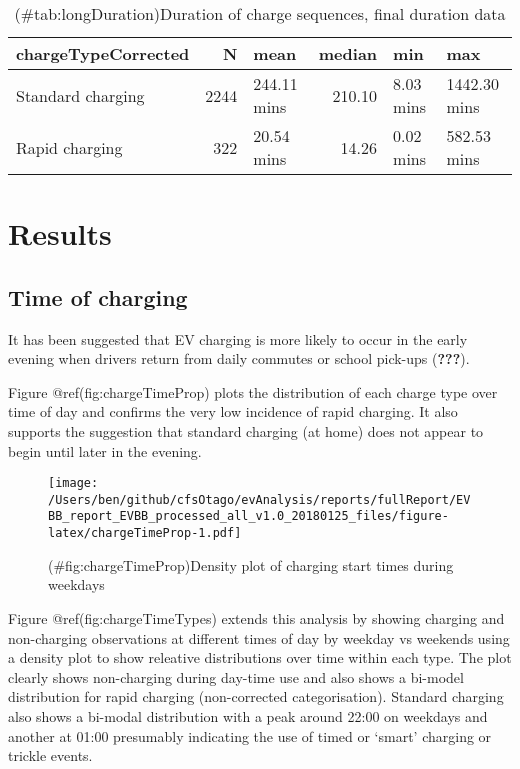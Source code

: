 \documentclass[]{article}
\begin{document}
\begin{table}[t]

\caption{(\#tab:longDuration)Duration of charge sequences, final duration data}
\centering
\begin{tabular}{l|r|l|r|l|l}
\hline
chargeTypeCorrected & N & mean & median & min & max\\
\hline
Standard charging & 2244 & 244.11 mins & 210.10 & 8.03 mins & 1442.30 mins\\
\hline
Rapid charging & 322 & 20.54 mins & 14.26 & 0.02 mins & 582.53 mins\\
\hline
\end{tabular}
\end{table}

\hypertarget{results}{%
\section{Results}\label{results}}

\hypertarget{time-of-charging}{%
\subsection{Time of charging}\label{time-of-charging}}

It has been suggested that EV charging is more likely to occur in the early evening when drivers return from daily commutes or school pick-ups ({\textbf{???}}).

Figure @ref(fig:chargeTimeProp) plots the distribution of each charge type over time of day and confirms the very low incidence of rapid charging. It also supports the suggestion that standard charging (at home) does not appear to begin until later in the evening.

\begin{figure}
\centering
\texttt{[image: /Users/ben/github/cfsOtago/evAnalysis/reports/fullReport/EVBB\_report\_EVBB\_processed\_all\_v1.0\_20180125\_files/figure-latex/chargeTimeProp-1.pdf]}
\caption{(\#fig:chargeTimeProp)Density plot of charging start times during weekdays}
\end{figure}

Figure @ref(fig:chargeTimeTypes) extends this analysis by showing charging and non-charging observations at different times of day by weekday vs weekends using a density plot to show releative distributions over time within each type. The plot clearly shows non-charging during day-time use and also shows a bi-model distribution for rapid charging (non-corrected categorisation). Standard charging also shows a bi-modal distribution with a peak around 22:00 on weekdays and another at 01:00 presumably indicating the use of timed or `smart' charging or trickle events.
\end{document}

